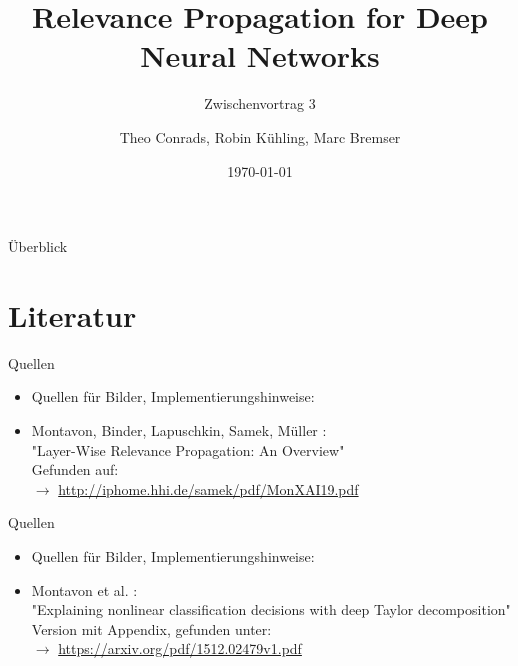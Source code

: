 \documentclass[t, compress]{beamer}
\title{Relevance Propagation for Deep Neural Networks}
\subtitle{Zwischenvortrag 3}
\author{Theo Conrads, Robin K\"uhling, Marc Bremser}
\date{\today}
\begin{document}
\begin{frame}
	\titlepage
\end{frame}

\begin{frame}{Überblick}
  \tableofcontents[hideallsubsections]
\end{frame}














\section{Literatur}
\begin{frame}{Quellen}
\begin{itemize}
\item Quellen für Bilder, Implementierungshinweise:
\item Montavon, Binder, Lapuschkin, Samek, Müller :  \\
"{}Layer-Wise Relevance Propagation: An Overview"{}\\
Gefunden auf: \\
$\rightarrow$ \url{http://iphome.hhi.de/samek/pdf/MonXAI19.pdf}
\label{itm:LRPOv}
\end{itemize}
\end{frame}

\begin{frame}{Quellen}
\begin{itemize}
\item Quellen für Bilder, Implementierungshinweise:
\item Montavon et al. : \\
"{}Explaining nonlinear classification decisions with deep Taylor decomposition"{}\\
Version mit Appendix, gefunden unter:\\
$\rightarrow$ \url{https://arxiv.org/pdf/1512.02479v1.pdf}
\label{itm:Mont17}
\end{itemize}
\end{frame}
\end{document}
